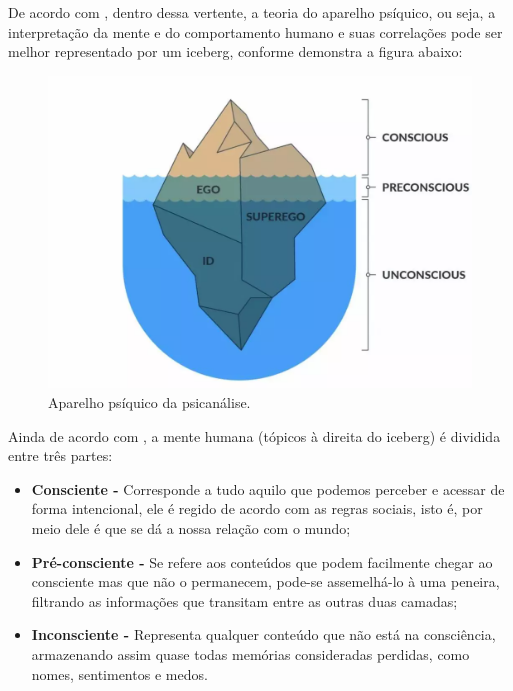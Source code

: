 De acordo com , dentro dessa vertente, a teoria do aparelho psíquico, ou seja, a interpretação da mente e do comportamento humano e suas correlações pode ser melhor representado por um iceberg, conforme demonstra a figura abaixo:

\begin{figure}[H]
    \centering
    \caption{Aparelho psíquico da psicanálise.}
    \label{fig:aparelhoPsiquicoPsicanalise}
    \includegraphics[width=.8\textwidth]{data/figures/psicanalise.png}
\end{figure}

Ainda de acordo com , a mente humana (tópicos à direita do iceberg) é dividida entre três partes:
\begin{itemize}
    \item \textbf{Consciente -} Corresponde a tudo aquilo que podemos perceber e acessar de forma intencional, ele é regido de acordo com as regras sociais, isto é, por meio dele é que se dá a nossa relação com o mundo;
    \item \textbf{Pré-consciente -} Se refere aos conteúdos que podem facilmente chegar ao consciente mas que não o permanecem, pode-se assemelhá-lo à uma peneira, filtrando as informações que transitam entre as outras duas camadas;
    \item \textbf{Inconsciente -} Representa qualquer conteúdo que não está na consciência, armazenando assim quase todas memórias consideradas perdidas, como nomes, sentimentos e medos.
\end{itemize}

